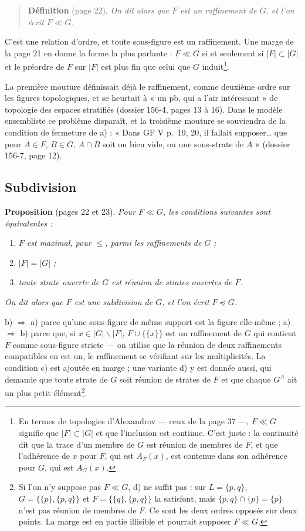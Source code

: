 \documentclass[11pt,a4paper]{article}
\begin{document}
\begin{quote}
\textbf{Définition} (page 22). \emph{On dit alors que $F$ est un
\emph{raffinement} de $G$, et l'on écrit $F \ll G$.}
\end{quote}

C'est une relation d'ordre, et toute sous-figure est un raffinement. Une marge
de la page 21 en donne la forme la plus parlante : $F \ll G$ si et seulement si
$|F| \subset |G|$ et le préordre de $F$ sur $|F|$ est plus fin que celui que
$G$ induit\footnote{En termes de topologies d'Alexandrov --- ceux de la page 37
---, $F \ll G$ signifie que $|F| \subset |G|$ et que l'inclusion est continue.
C'est juste : la continuité dit que la trace d'un membre de $G$ est réunion de
membres de $F$, et que l'adhérence de $x$ pour $F$, qui est $A_{F}(x)$, est
contenue dans son adhérence pour $G$, qui est $A_{G}(x)$.}.

La première mouture définissait déjà le raffinement, comme deuxième ordre sur
les figures topologiques, et se heurtait à « un pb, qui a l'air intéressant »
de topologie des espaces stratifiés (dossier 156-4, pages 13 à 16). Dans le
modèle ensembliste ce problème disparaît, et la troisième mouture se souviendra
de la condition de fermeture de a) : « Dans GF V p.~19, 20, il fallait
supposer\ldots{} que pour $A \in F$, $B \in G$, $A \cap B$ soit ou bien vide, ou
une sous-strate de $A$ » (dossier 156-7, page 12).

\subsection*{Subdivision}

\textbf{Proposition} (pages 22 et 23). \emph{Pour $F \ll G$, les conditions
suivantes sont équivalentes :}
\begin{enumerate}
\item[a)] \emph{$F$ est maximal, pour $\leq$, parmi les raffinements de $G$ ;}
\item[b)] \emph{$|F| = |G|$ ;}
\item[c)] \emph{toute strate ouverte de $G$ est réunion de strates ouvertes de
$F$.}
\end{enumerate}
\emph{On dit alors que $F$ est une \emph{subdivision} de $G$, et l'on écrit $F
\preccurlyeq G$.}

b) $\Rightarrow$ a) parce qu'une sous-figure de même support est la figure
elle-même ; a) $\Rightarrow$ b) parce que, si $x \in |G| \smallsetminus |F|$,
$F \cup \{\{x\}\}$ est un raffinement de $G$ qui contient $F$ comme sous-figure
stricte --- on utilise que la réunion de deux raffinements compatibles en est un,
le raffinement se vérifiant sur les multiplicités. La condition c) est ajoutée
en marge ; une variante d) y est donnée aussi, qui demande que toute strate de
$G$ soit réunion de strates de $F$ et que chaque $G^{A}$ ait un plus petit
élément\footnote{Si l'on n'y suppose pas $F \ll G$, d) ne suffit pas : sur $L =
\{p, q\}$, $G = \{\{p\}, \{p,q\}\}$ et $F = \{\{q\}, \{p,q\}\}$ la satisfont,
mais $\{p,q\} \cap \{p\} = \{p\}$ n'est pas réunion de membres de $F$. Ce sont
les deux ordres opposés sur deux points. La marge est en partie illisible et
pourrait supposer $F \ll G$.}.
\end{document}
